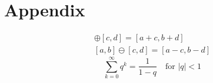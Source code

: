 \section{Appendix}
\begin{gather*}
    [a, b]\oplus [c, d] = [a+c, b+d] \\
    [a, b]\ominus [c, d] = [a-c, b-d]
\end{gather*}
\begin{equation*}
    \sum_{k=0}^{\infty} q^k = \frac{1}{1-q} \quad \text{for } |q| < 1
\end{equation*}